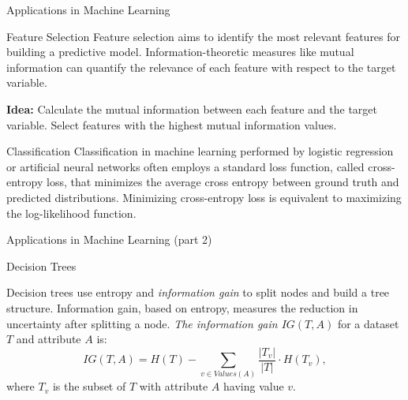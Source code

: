 \documentclass[aspectratio=169]{beamer}
\begin{document}
\begin{frame}{Applications in Machine Learning}
    \begin{block}{Feature Selection}
        Feature selection aims to identify the most relevant features for building a predictive model. Information-theoretic measures like mutual information can quantify the relevance of each feature with respect to the target variable.

        \textbf{Idea:} Calculate the mutual information between each feature and the target variable. Select features with the highest mutual information values.
    \end{block}

    \begin{block}{Classification}
        Classification in machine learning performed by logistic regression or artificial neural networks often employs a standard loss function, called cross-entropy loss, that minimizes the average cross entropy between ground truth and predicted distributions.
        Minimizing cross-entropy loss is equivalent to maximizing the log-likelihood function.
    \end{block}
\end{frame}


\begin{frame}{Applications in Machine Learning (part 2)}
    \begin{block}{Decision Trees}

        Decision trees use entropy and \emph{information gain} to split nodes and build a tree structure. Information gain, based on entropy, measures the reduction in uncertainty after splitting a node.
        \emph{The information gain $IG(T,A)$} for a dataset $T$ and attribute $A$ is:
        \[
        IG(T,A) = H(T) - \sum_{v \in Values(A)} \frac{|T_v|}{|T|}\cdot H(T_v),
        \]
        where $T_v$ is the subset of $T$ with attribute $A$ having value $v$.
    \end{block}

\end{frame}
\end{document}
